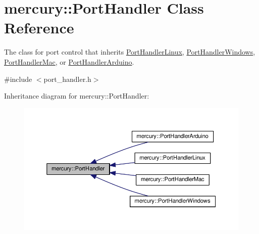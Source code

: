 \hypertarget{classmercury_1_1_port_handler}{}\section{mercury\+:\+:Port\+Handler Class Reference}
\label{classmercury_1_1_port_handler}


The class for port control that inherits \hyperlink{classmercury_1_1_port_handler_linux}{Port\+Handler\+Linux}, \hyperlink{classmercury_1_1_port_handler_windows}{Port\+Handler\+Windows}, \hyperlink{classmercury_1_1_port_handler_mac}{Port\+Handler\+Mac}, or \hyperlink{classmercury_1_1_port_handler_arduino}{Port\+Handler\+Arduino}.  




{\ttfamily \#include $<$port\+\_\+handler.\+h$>$}



Inheritance diagram for mercury\+:\+:Port\+Handler\+:\nopagebreak
\begin{figure}[H]
\begin{center}
\leavevmode
\includegraphics[width=350pt]{classmercury_1_1_port_handler__inherit__graph}
\end{center}
\end{figure}
